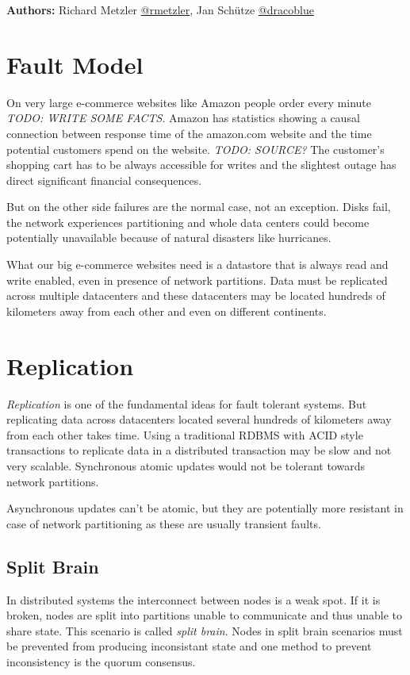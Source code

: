\documentclass{llncs}
\begin{document}
\textbf{Authors:} Richard Metzler
\href{twitter.com/rmetzler}{@rmetzler}, Jan Schütze
\href{twitter.com/dracoblue}{@dracoblue}

\section{Fault Model}

On very large e-commerce websites like Amazon people order every
minute \emph{TODO: WRITE SOME FACTS}. Amazon has statistics showing
a causal connection between response time of the amazon.com website
and the time potential customers spend on the website.
\emph{TODO: SOURCE?} The customer's shopping cart has to be always
accessible for writes and the slightest outage has direct
significant financial consequences.

But on the other side failures are the normal case, not an
exception. Disks fail, the network experiences partitioning and
whole data centers could become potentially unavailable because of
natural disasters like hurricanes.

What our big e-commerce websites need is a datastore that is always
read and write enabled, even in presence of network partitions.
Data must be replicated across multiple datacenters and these
datacenters may be located hundreds of kilometers away from each
other and even on different continents.

\section{Replication}

\emph{Replication} is one of the fundamental ideas for fault
tolerant systems. But replicating data across datacenters located
several hundreds of kilometers away from each other takes time.
Using a traditional RDBMS with ACID style transactions to replicate
data in a distributed transaction may be slow and not very
scalable. Synchronous atomic updates would not be tolerant towards
network partitions.

Asynchronous updates can't be atomic, but they are potentially more
resistant in case of network partitioning as these are usually
transient faults.

\subsection{Split Brain}

In distributed systems the interconnect between nodes is a weak
spot. If it is broken, nodes are split into partitions unable to
communicate and thus unable to share state. This scenario is called
\emph{split brain}. Nodes in split brain scenarios must be
prevented from producing inconsistant state and one method to
prevent inconsistency is the quorum consensus.
\end{document}
